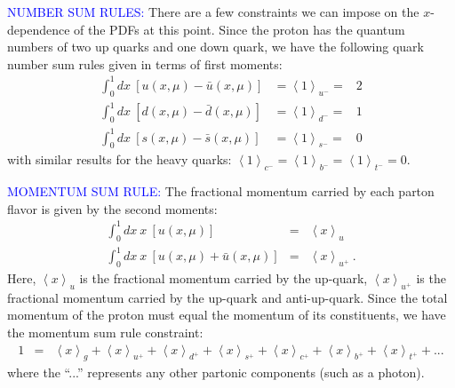\textcolor{blue}{NUMBER SUM RULES:} 
There are a few constraints we
can impose on the $x$-dependence of the PDFs at this point. Since
the proton has the quantum numbers of two up quarks and one down quark,
we have the following quark number sum rules given in terms of first
moments: 
%
\begin{eqnarray*}
\int_{0}^{1}dx\ \left[u(x,\mu)-\bar{u}(x,\mu)\right] & =\left\langle 1\right\rangle _{u^{-}}= & 2\\
\int_{0}^{1}dx\ \left[d(x,\mu)-\bar{d}(x,\mu)\right] & =\left\langle 1\right\rangle _{d^{-}}= & 1\\
\int_{0}^{1}dx\ \left[s(x,\mu)-\bar{s}(x,\mu)\right] & =\left\langle 1\right\rangle _{s^{-}}= & 0
\end{eqnarray*}
with similar results for the heavy quarks: $\left\langle 1\right\rangle _{c^{-}}=\left\langle 1\right\rangle _{b^{-}}=\left\langle 1\right\rangle _{t^{-}}=0$.

\textcolor{blue}{MOMENTUM SUM RULE:} The fractional momentum carried
by each parton flavor is given by the second moments: 
%
\begin{eqnarray*}
\int_{0}^{1}dx\ x\ \left[u(x,\mu)\right] & = & \left\langle x\right\rangle _{u}\\
\int_{0}^{1}dx\ x\ \left[u(x,\mu)+\bar{u}(x,\mu)\right] & = & \left\langle x\right\rangle _{u^{+}}\ .
\end{eqnarray*}
%
Here, $\left\langle x\right\rangle _{u}$ is the fractional momentum
carried by the up-quark, $\left\langle x\right\rangle _{u^{+}}$ is
the fractional momentum carried by the up-quark and anti-up-quark.
Since the total momentum of the proton must equal the momentum of
its constituents, we have the momentum sum rule constraint: 
%
\begin{eqnarray*}
1 & = & \left\langle x\right\rangle _{g}+\left\langle x\right\rangle _{u^{+}}+\left\langle x\right\rangle _{d^{+}}+\left\langle x\right\rangle _{s^{+}}+\left\langle x\right\rangle _{c^{+}}+\left\langle x\right\rangle _{b^{+}}+\left\langle x\right\rangle _{t^{+}}+...
\end{eqnarray*}
%
where the ``...'' represents any other partonic components (such
as a photon). 

